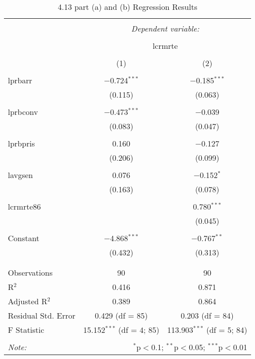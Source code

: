 \documentclass[11pt]{article} %
\begin{document}
  \begin{table}[!htbp] \centering 
    \caption{4.13 part (a) and (b) Regression Results} 
    \label{table:4.13b} 
  \begin{tabular}{@{\extracolsep{5pt}}lcc} 
  \\[-1.8ex]\hline 
  \hline \\[-1.8ex] 
   & \multicolumn{2}{c}{\textit{Dependent variable:}} \\ 
  \cline{2-3} 
  \\[-1.8ex] & \multicolumn{2}{c}{lcrmrte} \\ 
  \\[-1.8ex] & (1) & (2)\\ 
  \hline \\[-1.8ex] 
   lprbarr & $-$0.724$^{***}$ & $-$0.185$^{***}$ \\ 
    & (0.115) & (0.063) \\ 
    & & \\ 
   lprbconv & $-$0.473$^{***}$ & $-$0.039 \\ 
    & (0.083) & (0.047) \\ 
    & & \\ 
   lprbpris & 0.160 & $-$0.127 \\ 
    & (0.206) & (0.099) \\ 
    & & \\ 
   lavgsen & 0.076 & $-$0.152$^{*}$ \\ 
    & (0.163) & (0.078) \\ 
    & & \\ 
   lcrmrte86 &  & 0.780$^{***}$ \\ 
    &  & (0.045) \\ 
    & & \\ 
   Constant & $-$4.868$^{***}$ & $-$0.767$^{**}$ \\ 
    & (0.432) & (0.313) \\ 
    & & \\ 
  \hline \\[-1.8ex] 
  Observations & 90 & 90 \\ 
  R$^{2}$ & 0.416 & 0.871 \\ 
  Adjusted R$^{2}$ & 0.389 & 0.864 \\ 
  Residual Std. Error & 0.429 (df = 85) & 0.203 (df = 84) \\ 
  F Statistic & 15.152$^{***}$ (df = 4; 85) & 113.903$^{***}$ (df = 5; 84) \\ 
  \hline 
  \hline \\[-1.8ex] 
  \textit{Note:}  & \multicolumn{2}{r}{$^{*}$p$<$0.1; $^{**}$p$<$0.05; $^{***}$p$<$0.01} \\ 
  \end{tabular} 
  \end{table} 
\end{document}
